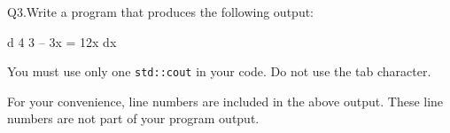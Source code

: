 Q3.Write a program that produces the following output:
\begin{console}[numbers=left]
 d   4      3
-- 3x  = 12x
dx

\end{console}
You must use only one \verb!std::cout! in your code. 
Do not use the tab character. 

For your convenience, line numbers are included in the above output.
These line numbers are not part of your program output.

